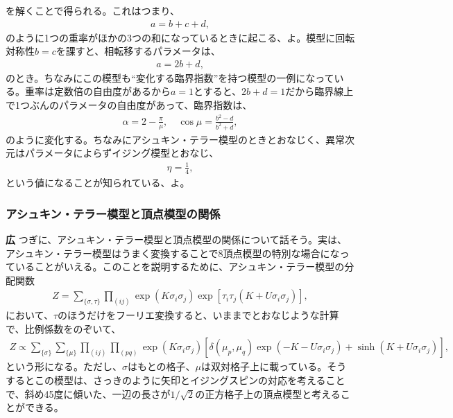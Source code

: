 \documentclass[paper=b5j,fontsize=12Q,jafontsize=12Q,baselineskip=21Q]{jlreq}
\DeclareRobustCommand{\hiron}{\textbf{広 }}
\begin{document}
\begin{refsection}
を解くことで得られる。これはつまり、
\begin{align}
  a=b+c+d,
\end{align}
のように1つの重率がほかの3つの和になっているときに起こる、よ。模型に回転対称性$b=c$を課すと、相転移するパラメータは、
\begin{align}
  a=2b+d,
\end{align}
のとき。ちなみにこの模型も``変化する臨界指数''を持つ模型の一例になっている。重率は定数倍の自由度があるから$a=1$とすると、$2b+d=1$だから臨界線上で1つぶんのパラメータの自由度があって、臨界指数は、
\begin{align}
  \alpha=2-\frac\pi\mu,\quad\cos\mu=\frac{b^2-d}{b^2+d},
\end{align}
のように変化する。ちなみにアシュキン・テラー模型のときとおなじく、異常次元はパラメータによらずイジング模型とおなじ、
\begin{align}
  \eta=\frac14,
\end{align}
という値になることが知られている、よ。

\subsubsection{アシュキン・テラー模型と頂点模型の関係}
\hiron つぎに、アシュキン・テラー模型と頂点模型の関係について話そう。実は、アシュキン・テラー模型はうまく変換することで8頂点模型の特別な場合になっていることがいえる。このことを説明するために、アシュキン・テラー模型の分配関数
\begin{align}
  Z=\sum_{\{\sigma,\tau\}}\prod_{(ij)}\exp(K\sigma_i\sigma_j)\exp\left[\tau_i\tau_j(K+U\sigma_i\sigma_j)\right],
\end{align}
において、$\tau$のほうだけをフーリエ変換すると、いままでとおなじような計算で、比例係数をのぞいて、
\begin{align}
  Z\propto\sum_{\{\sigma\}}\sum_{\{\mu\}}\prod_{(ij)}\prod_{(pq)}\exp(K\sigma_i\sigma_j)\left[\delta(\mu_p,\mu_q)\exp(-K-U\sigma_i\sigma_j)+\sinh(K+U\sigma_i\sigma_j)\right],
\end{align}
という形になる。ただし、$\sigma$はもとの格子、$\mu$は双対格子上に載っている。そうするとこの模型は、さっきのように矢印とイジングスピンの対応を考えることで、斜め45度に傾いた、一辺の長さが$1/\sqrt2$の正方格子上の頂点模型と考えることができる。

\begin{center}
\end{center}
\end{refsection}
\end{document}
